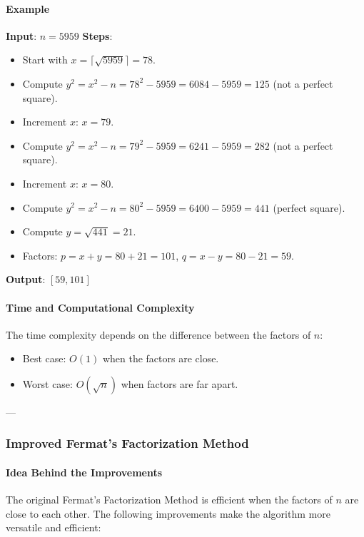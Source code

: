 \documentclass[12pt]{report}
\begin{document}
\paragraph{Example}

\textbf{Input}: $n = 5959$  
\textbf{Steps}:
\begin{itemize}
    \item Start with $x = \lceil \sqrt{5959} \rceil = 78$.
    \item Compute $y^2 = x^2 - n = 78^2 - 5959 = 6084 - 5959 = 125$ (not a perfect square).
    \item Increment $x$: $x = 79$.
    \item Compute $y^2 = x^2 - n = 79^2 - 5959 = 6241 - 5959 = 282$ (not a perfect square).
    \item Increment $x$: $x = 80$.
    \item Compute $y^2 = x^2 - n = 80^2 - 5959 = 6400 - 5959 = 441$ (perfect square).
    \item Compute $y = \sqrt{441} = 21$.
    \item Factors: $p = x + y = 80 + 21 = 101$, $q = x - y = 80 - 21 = 59$.
\end{itemize}  
\textbf{Output}: $[59, 101]$  

\paragraph{Time and Computational Complexity}

The time complexity depends on the difference between the factors of $n$:
\begin{itemize}
    \item Best case: $O(1)$ when the factors are close.
    \item Worst case: $O(\sqrt{n})$ when factors are far apart.
\end{itemize}

---

\subsubsection{Improved Fermat's Factorization Method}

\paragraph{Idea Behind the Improvements}

The original Fermat’s Factorization Method is efficient when the factors of $n$ are close to each other. The following improvements make the algorithm more versatile and efficient:
\end{document}
